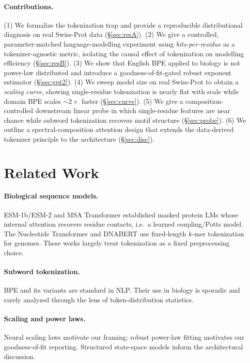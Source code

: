 \documentclass[11pt]{article}
\begin{document}
\paragraph{Contributions.}
(1) We formalize the tokenization trap and provide a reproducible distributional
diagnosis on real Swiss-Prot data (\S\ref{sec:resA}).
(2) We give a controlled, parameter-matched language-modelling experiment using
\emph{bits-per-residue} as a tokenizer-agnostic metric, isolating the causal
effect of tokenization on modelling efficiency (\S\ref{sec:resB}).
(3) We show that English BPE applied to biology is not power-law distributed and
introduce a goodness-of-fit-gated robust exponent estimator
(\S\ref{sec:gpt2}).
(4) We sweep model size on real Swiss-Prot to obtain a \emph{scaling curve},
showing single-residue tokenization is nearly flat with scale while domain BPE
scales $\sim\!2\times$ faster (\S\ref{sec:curve}).
(5) We give a composition-controlled downstream linear probe in which
single-residue features are near chance while subword tokenization recovers motif
structure (\S\ref{sec:probe}).
(6) We outline a spectral-composition attention design that extends the
data-derived tokenizer principle to the architecture (\S\ref{sec:disc}).

\section{Related Work}
\paragraph{Biological sequence models.} ESM-1b/ESM-2 \citep{rives2021,lin2023}
and MSA Transformer \citep{rao2021} established masked protein LMs whose internal
attention recovers residue contacts, i.e.\ a learned coupling/Potts model. The
Nucleotide Transformer \citep{dallatorre2023} and DNABERT use fixed-length
$k$-mer tokenization for genomes. These works largely treat tokenization as a
fixed preprocessing choice.
\paragraph{Subword tokenization.} BPE \citep{sennrich2016} and its variants are
standard in NLP. Their use in biology is sporadic and rarely analyzed through the
lens of token-distribution statistics.
\paragraph{Scaling and power laws.} Neural scaling laws \citep{kaplan2020}
motivate our framing; robust power-law fitting \citep{clauset2009} motivates our
goodness-of-fit reporting. Structured state-space models \citep{gu2023mamba}
inform the architectural discussion.
\end{document}
